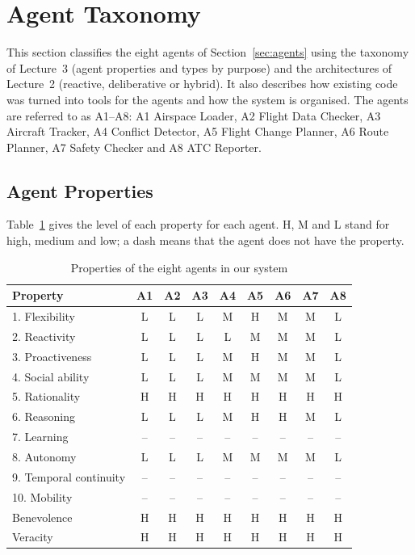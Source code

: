 \section{Agent Taxonomy}\label{sec:taxonomy}

This section classifies the eight agents of Section~\ref{sec:agents} using the taxonomy of Lecture~3 \cite{urvlect3,nwana1996} (agent properties and types by purpose) and the architectures of Lecture~2 \cite{urvlect2,wooldridge2009} (reactive, deliberative or hybrid). It also describes how existing code was turned into tools for the agents and how the system is organised. The agents are referred to as A1--A8: A1 Airspace Loader, A2 Flight Data Checker, A3 Aircraft Tracker, A4 Conflict Detector, A5 Flight Change Planner, A6 Route Planner, A7 Safety Checker and A8 ATC Reporter.

\subsection{Agent Properties}\label{sec:properties}

Table~\ref{tab:properties} gives the level of each property for each agent. H, M and L stand for high, medium and low; a dash means that the agent does not have the property.

\begin{table}[!t]
\centering
\caption{Properties of the eight agents in our system}
\label{tab:properties}
\small
\begin{tabular}{l*{8}{c}}
\toprule
\textbf{Property} & \textbf{A1} & \textbf{A2} & \textbf{A3} & \textbf{A4} & \textbf{A5} & \textbf{A6} & \textbf{A7} & \textbf{A8} \\
\midrule
1. Flexibility          & L & L & L & M & H & M & M & L \\
2. Reactivity           & L & L & L & L & M & M & M & L \\
3. Proactiveness        & L & L & L & M & H & M & M & L \\
4. Social ability       & L & L & L & M & M & M & M & L \\
5. Rationality          & H & H & H & H & H & H & H & H \\
6. Reasoning            & L & L & L & M & H & H & M & L \\
7. Learning             & -- & -- & -- & -- & -- & -- & -- & -- \\
8. Autonomy             & L & L & L & M & M & M & M & L \\
9. Temporal continuity  & -- & -- & -- & -- & -- & -- & -- & -- \\
10. Mobility            & -- & -- & -- & -- & -- & -- & -- & -- \\
\midrule
Benevolence             & H & H & H & H & H & H & H & H \\
Veracity                & H & H & H & H & H & H & H & H \\
\bottomrule
\end{tabular}
\end{table}

